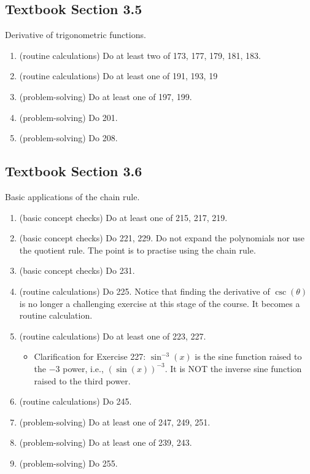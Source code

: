 \documentclass[../main.tex]{subfiles}
\begin{document}
\subsection*{Textbook Section 3.5}

Derivative of trigonometric functions.
\begin{enumerate}
  \item (routine calculations) Do at least two of 173, 177, 179, 181, 183.
  \item (routine calculations) Do at least one of 191, 193, 19
  \item (problem-solving) Do at least one of 197, 199.
  \item (problem-solving) Do 201.
  \item (problem-solving) Do 208.
\end{enumerate}

\clearpage
\subsection*{Textbook Section 3.6}

Basic applications of the chain rule.
\begin{enumerate}
  \item (basic concept checks) Do at least one of 215, 217, 219.
  \item (basic concept checks) Do 221, 229. Do not expand the polynomials nor use the quotient rule. The point is to practise using the chain rule.
  \item (basic concept checks) Do 231. 
  \item (routine calculations) Do 225.  Notice that finding the derivative of \(\csc(\theta)\) is no longer a challenging exercise at this stage of the course. It becomes a routine calculation.
  \item (routine calculations) Do at least one of 223, 227. 
    \begin{itemize}
      \item Clarification for Exercise 227: \(\sin^{-3}(x)\) is the sine function raised to the \(-3\) power, i.e., \((\sin(x))^{-3}\). It is NOT the inverse sine function raised to the third power.
    \end{itemize}
  \item (routine calculations) Do 245.
  \item (problem-solving) Do at least one of 247, 249, 251. 
  \item (problem-solving) Do at least one of 239, 243.
  \item (problem-solving) Do 255.
\end{enumerate}
\end{document}
